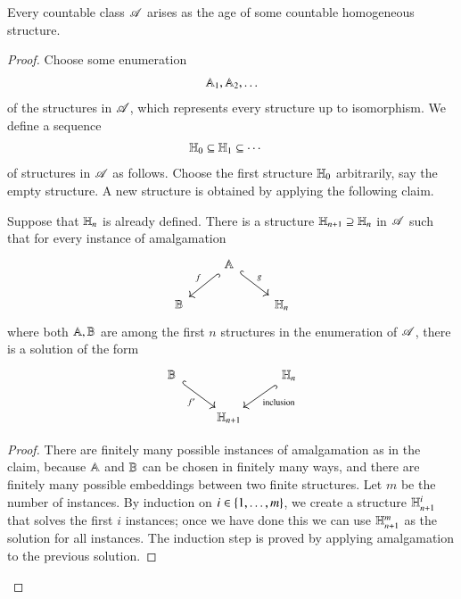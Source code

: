 \begin{lemma}\label{lem:fraisse-surjective}
	Every countable \fraisse class $\mathscr A$ arises as the age of some countable homogeneous structure.
\end{lemma}
	\begin{proof}
		Choose some enumeration 
		\begin{align}\label{eq:fraisse-enumeration}
		\mathbb A_1,\mathbb A_2,\ldots
		\end{align}
		of the structures in $\mathscr A$, which represents every structure up to isomorphism. We define a sequence 
		 \begin{align}\label{eq:fraisse-limit-approximation}
			\mathbb H_0 \subseteq \mathbb H_1 \subseteq\cdots \quad 
		 \end{align}
		 of structures in $\mathscr A$ as follows. Choose the first structure $\mathbb H_0$ arbitrarily, say the empty structure. A new structure is obtained by applying the following claim. 
		 
		 \begin{claim}\label{claim:structh}
			Suppose that $\mathbb H_n$ is already defined. There is a structure $\mathbb H_{n+1}  \supseteq \mathbb H_n$ in $\mathscr A$ such that for every instance of amalgamation 
			\[
			\begin{tikzcd}
			& \structa 
			\ar[dl,hookrightarrow,"f"']
			\ar[dr,hookrightarrow,"g"]
			\\
			\structb & & \structh_{n}
			\end{tikzcd}
			\]
			where both $\mathbb A, \mathbb B$ are among the first $n$ structures in the enumeration of $\mathscr A$, there is a solution  of the form
			\[
				\begin{tikzcd}
				\structb 
				\ar[dr,hookrightarrow,"f'"']& & \structh_{n}
				\ar[dl,hookrightarrow,"\text{inclusion}"]
				\\
				& \structh_{n+1}
				\end{tikzcd}
				\]
		 \end{claim}
		 \begin{proof}
			There are finitely many possible instances of amalgamation as in the claim, because $\mathbb A$ and $\mathbb B$ can be chosen in finitely many ways, and there are finitely many possible embeddings between two finite structures.  Let  $m$ be the number of instances. By induction on $i \in \{1,\ldots,m\}$, we create a structure $\mathbb H^i_{n+1}$ that solves the first $i$ instances; once we have done this we can use $\mathbb H^m_{n+1}$ as the solution for all instances. The induction step is proved by applying amalgamation to the previous  solution.
		 \end{proof}


\end{proof}
